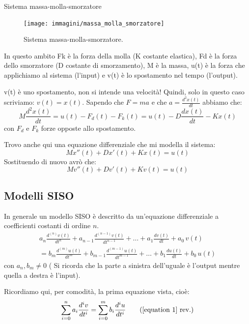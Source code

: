 \begin{nexample}
	\label{es_mms}
	Sistema massa-molla-smorzatore 
	
		\begin{figure}[H]
			\centering
			\texttt{[image: immagini/massa\_molla\_smorzatore]}
			\caption{ Sistema massa-molla-smorzatore. }
			\label{fig: massa_molla_smorzatore}
		\end{figure}
		
		In questo ambito Fk è la forza della molla (K costante elastica), Fd è la forza dello smorzatore (D costante di smorzamento), M è la massa, u(t) è la forza che applichiamo al sistema (l'input) e v(t) è lo spostamento nel tempo (l'output).
		
		\begin{NB}
			 v(t) è uno spostamento, non si intende una velocità! Quindi, solo in questo caso scriviamo: $ v(t) = x(t) $.
			Sapendo che $ F=ma $ e che $a= \frac{d^2 x(t)}{dt} $ abbiamo che:
			\[  M \frac{d^2 x(t)}{dt} = u(t) - F_d(t) - F_k(t) = u(t) - D \frac{d x(t)}{dt} - K x(t) \]
			con $ F_d $ e $ F_k $ forze opposte allo spostamento.
		\end{NB}
		
		Trovo anche qui una equazione differenziale che mi modella il sistema:
		\[  M x''(t) + D x'(t) + K x(t) = u(t) \]
		Sostituendo di nuovo avrò che:
		\[ M v''(t) + D v'(t) + K v(t) = u(t) \]
\end{nexample}


\subsection{Modelli SISO}

	In generale un modello SISO è descritto da un'equazione differenziale a coefficienti costanti di ordine $ n $.
	\begin{multline}
		a_n \frac{d^{(n)} v(t)}{dt^n} 
			+ a_{n-1} \frac{d^{(n-1)} v(t)}{dt^{n-1}} 
			+ \dots 
			+ a_1 \frac{dv(t)}{dt} 
			+ a_0\,v(t)\\
		= b_m \frac{d^{(m)} u(t)}{dt^m}
			+ b_{m-1} \frac{d^{(m-1)} u(t)}{dt^{m-1}} 
			+ \dots
			+ b_1 \frac{du(t)}{dt} 
			+ b_0\,u(t)
	\tag{2}\label{equation 2}
	\end{multline}
	con $ a_n, b_m \ne 0 $ ( Si ricorda che la parte a sinistra dell'uguale è l'output mentre quella a destra è l'input).
	
	Ricordiamo qui, per comodità, la prima equazione vista, cioè:
	\begin{equation*}
		\sum\limits_{i=0}^n a_{i} \frac{ d^{i} v }{ dt^{i}  } = \sum\limits_{i=0}^m b_{i} \frac{ d^{i} u }{ dt^{i}  }
		\tag{\ref{equation 1} rev.}
	\end{equation*}

